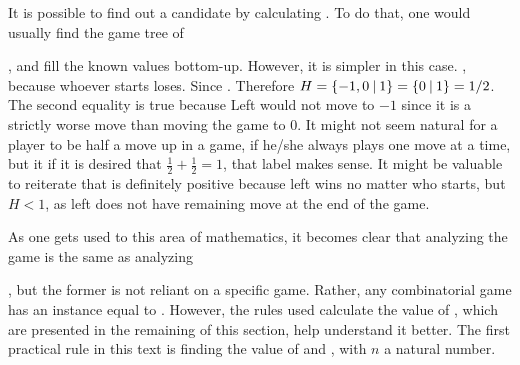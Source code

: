 It is possible to find out a candidate by calculating \Gm{ + \Hm + \Hm}. To do that, one would usually find the game tree of 
\Gm{ + \Hm + \Hm}
, and fill the known values bottom-up. However, it is simpler in this case. , because whoever starts loses. Since . Therefore $H = \mbox{$\{{-}1, 0\:|\:1\}$} = \mbox{$\{0\:|\:1\}$} = 1/2$. The second equality is true because Left would not move to $-1$ since it is a strictly worse move than moving the game to $0$. It might not seem natural for a player to be half a move up in a game, if he/she always plays one move at a time, but it if it is desired that $\frac{1}{2} + \frac{1}{2} = 1$, that label makes sense. It might be valuable to reiterate that \Hm is definitely positive because left wins no matter who starts, but $H < 1$, as left does not have remaining move at the end of the game.

As one gets used to this area of mathematics, it becomes clear that analyzing the game  is the same as analyzing 
, but the former is not reliant on a specific game. Rather, any combinatorial game has an instance equal to . However, the rules used calculate the value of , which are presented in the remaining of this section, help understand it better. The first practical rule in this text is finding the value of  and , with $n$ a natural number.

